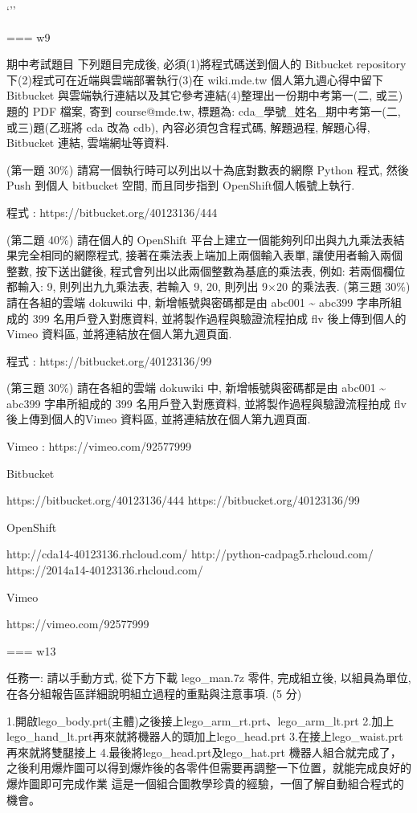 \documentclass[]{article}
\begin{document}
`''

=== w9

期中考試題目 下列題目完成後, 必須(1)將程式碼送到個人的 Bitbucket
repository 下(2)程式可在近端與雲端部署執行(3)在 wiki.mde.tw
個人第九週心得中留下 Bitbucket
與雲端執行連結以及其它參考連結(4)整理出一份期中考第一(二, 或三)題的 PDF
檔案, 寄到 course@mde.tw, 標題為: cda\_學號\_姓名\_期中考第一(二,
或三)題(乙班將 cda 改為 cdb), 內容必須包含程式碼, 解題過程, 解題心得,
Bitbucket 連結, 雲端網址等資料.

(第一題 30\%) 請寫一個執行時可以列出以十為底對數表的網際 Python 程式,
然後 Push 到個人 bitbucket 空間, 而且同步指到 OpenShift個人帳號上執行.

程式 : https://bitbucket.org/40123136/444

(第二題 40\%) 請在個人的 OpenShift
平台上建立一個能夠列印出與九九乘法表結果完全相同的網際程式,
接著在乘法表上端加上兩個輸入表單, 讓使用者輸入兩個整數, 按下送出鍵後,
程式會列出以此兩個整數為基底的乘法表, 例如: 若兩個欄位都輸入: 9,
則列出九九乘法表, 若輸入 9, 20, 則列出 9×20 的乘法表. (第三題 30\%)
請在各組的雲端 dokuwiki 中, 新增帳號與密碼都是由 abc001
\textasciitilde{} abc399 字串所組成的 399 名用戶登入對應資料,
並將製作過程與驗證流程拍成 flv 後上傳到個人的 Vimeo 資料區,
並將連結放在個人第九週頁面.

程式 : https://bitbucket.org/40123136/99

(第三題 30\%) 請在各組的雲端 dokuwiki 中, 新增帳號與密碼都是由 abc001
\textasciitilde{} abc399 字串所組成的 399 名用戶登入對應資料,
並將製作過程與驗證流程拍成 flv 後上傳到個人的Vimeo 資料區,
並將連結放在個人第九週頁面.

Vimeo : https://vimeo.com/92577999

Bitbucket

https://bitbucket.org/40123136/444 https://bitbucket.org/40123136/99

OpenShift

http://cda14-40123136.rhcloud.com/ http://python-cadpag5.rhcloud.com/
https://2014a14-40123136.rhcloud.com/

Vimeo

https://vimeo.com/92577999

=== w13

任務一: 請以手動方式, 從下方下載 lego\_man.7z 零件, 完成組立後,
以組員為單位, 在各分組報告區詳細說明組立過程的重點與注意事項. (5 分)

1.開啟lego\_body.prt(主體)之後接上lego\_arm\_rt.prt、lego\_arm\_lt.prt
2.加上lego\_hand\_lt.prt再來就將機器人的頭加上lego\_head.prt
3.在接上lego\_waist.prt再來就將雙腿接上
4.最後將lego\_head.prt及lego\_hat.prt 機器人組合就完成了，
之後利用爆炸圖可以得到爆炸後的各零件但需要再調整一下位置，就能完成良好的爆炸圖即可完成作業
這是一個組合圖教學珍貴的經驗，一個了解自動組合程式的機會。
\end{document}
